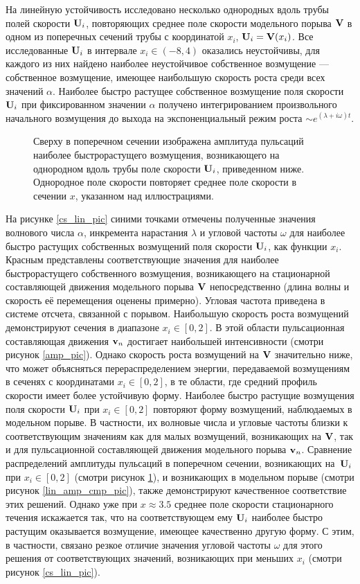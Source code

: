 На линейную устойчивость исследовано несколько однородных вдоль трубы полей скорости $\mathbf{U}_i$, повторяющих среднее поле скорости модельного порыва $\mathbf{V}$ в одном из поперечных сечений трубы с координатой $x_i$, $\mathbf{U}_i=\mathbf{V}(x_i)$. Все исследованные $\mathbf{U}_i$ в интервале $x_i \in (-8, 4)$ оказались неустойчивы, для каждого из них найдено наиболее неустойчивое собственное возмущение --- собственное возмущение, имеющее наибольшую скорость роста среди всех значений $\alpha$. Наиболее быстро растущее собственное возмущение поля скорости $\mathbf{U}_i$ при фиксированном значении $\alpha$ получено интегрированием произвольного начального возмущения до выхода на экспоненциальный режим роста $\sim e^{(\lambda + i\omega) t}$. 

\begin{figure}
\caption{Сверху в поперечном сечении изображена амплитуда пульсаций наиболее быстрорастущего возмущения, возникающего на однородном вдоль трубы поле скорости $\mathbf{U}_i$, приведенном ниже. Однородное поле скорости повторяет среднее поле скорости в сечении $x$, указанном над иллюстрациями.}
\label{cs_lin_map_pic}
\end{figure}

На рисунке \ref{cs_lin_pic} синими точками отмечены полученные значения волнового числа $\alpha$, инкремента нарастания $\lambda$ и угловой частоты $\omega$ для наиболее быстро растущих собственных возмущений поля скорости $\mathbf{U}_i$, как функции $x_i$. Красным представлены соответствующие значения для наиболее быстрорастущего собственного возмущения, возникающего на стационарной составляющей движения модельного порыва $\mathbf{V}$ непосредственно (длина волны и скорость её перемещения оценены примерно). Угловая частота приведена в системе отсчета, связанной с порывом. Наибольшую скорость роста возмущений демонстрируют сечения в диапазоне $x_i \in [0, 2]$. В этой области пульсационная составляющая движения $\mathbf{v}_n$ достигает наибольшей интенсивности (смотри рисунок \ref{amp_pic}). Однако скорость роста возмущений на $\mathbf{V}$ значительно ниже, что может объясняться перераспределением энергии, передаваемой возмущениям в сеченях с координатами $x_i \in [0, 2]$, в те области, где средний профиль скорости имеет более устойчивую форму. Наиболее быстро растущие возмущения поля скорости $\mathbf{U}_i$ при $x_i \in [0,2]$ повторяют форму возмущений, наблюдаемых в модельном порыве. В частности, их волновые числа и угловые частоты близки к соответствующим значениям как для малых возмущений, возникающих на $\mathbf{V}$, так и для пульсационной составляющей движения модельного порыва $\mathbf{v}_n$. Сравнение распределений амплитуды пульсаций в поперечном сечении, возникающих на~$\mathbf{U}_i$ при $x_i \in [0,2]$ (смотри рисунок \ref{cs_lin_map_pic}), и возникающих в модельном порыве (смотри рисунок \ref{lin_amp_cmp_pic}), также демонстрируют качественное соответствие этих решений. Однако уже при $x \approx 3.5$ среднее поле скорости стационарного течения искажается так, что на соответствующем ему $\mathbf{U}_i$ наиболее быстро растущим оказывается возмущение, имеющее качественно другую форму. С этим, в частности, связано резкое отличие значения угловой частоты $\omega$ для этого решения от соответствующих значений, возникающих при меньших $x_i$ (смотри рисунок \ref{cs_lin_pic}). 

